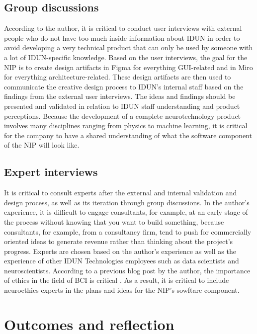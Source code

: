 \subsection{Group discussions}
\label{chapter3-group-discussions}

According to the author, it is critical to conduct user interviews with external people who do not have too much inside information about IDUN in order to avoid developing a very technical product that can only be used by someone with a lot of IDUN-specific knowledge. Based on the user interviews, the goal for the NIP is to create design artifacts in Figma for everything GUI-related and in Miro for everything architecture-related. These design artifacts are then used to communicate the creative design process to IDUN's internal staff based on the findings from the external user interviews. The ideas and findings should be presented and validated in relation to IDUN staff understanding and product perceptions. Because the development of a complete neurotechnology product involves many disciplines ranging from physics to machine learning, it is critical for the company to have a shared understanding of what the software component of the NIP will look like.

\subsection{Expert interviews}
\label{chapter3-expert-interviews}

It is critical to consult experts after the external and internal validation and design process, as well as its iteration through group discussions. In the author's experience, it is difficult to engage consultants, for example, at an early stage of the process without knowing that you want to build something, because consultants, for example, from a consultancy firm, tend to push for commercially oriented ideas to generate revenue rather than thinking about the project's progress. Experts are chosen based on the author's experience as well as the experience of other IDUN Technologies employees such as data scientists and neuroscientists. According to a previous blog post by the author, the importance of ethics in the field of BCI is critical \citep{burger_influence_2022}. As a result, it is critical to include neuroethics experts in the plans and ideas for the NIP's sowftare component.

\section{Outcomes and reflection}
\label{chapter3-outcomes-and-reflection}

